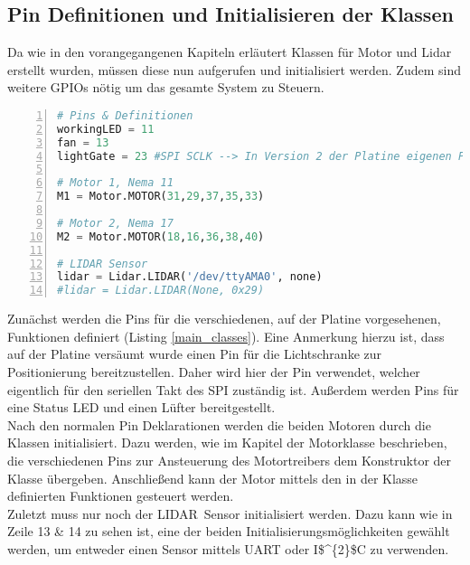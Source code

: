 \subsection{Pin Definitionen und Initialisieren der Klassen}
Da wie in den vorangegangenen Kapiteln erläutert Klassen für Motor und Lidar erstellt wurden, müssen diese nun aufgerufen und initialisiert werden. Zudem sind weitere \acp{GPIO} nötig um das gesamte System zu Steuern.
\begin{lstlisting}[caption={Initialisieren von Variablen und Klassen}, language={Python}, label={main_classes}, numbers=left]
# Pins & Definitionen
workingLED = 11
fan = 13
lightGate = 23 #SPI SCLK --> In Version 2 der Platine eigenen Pin zuweisen

# Motor 1, Nema 11
M1 = Motor.MOTOR(31,29,37,35,33)

# Motor 2, Nema 17
M2 = Motor.MOTOR(18,16,36,38,40)

# LIDAR Sensor
lidar = Lidar.LIDAR('/dev/ttyAMA0', none)
#lidar = Lidar.LIDAR(None, 0x29)
\end{lstlisting}
Zunächst werden die Pins für die verschiedenen, auf der Platine vorgesehenen, Funktionen definiert (Listing \ref{main_classes}). Eine Anmerkung hierzu ist, dass auf der Platine versäumt wurde einen Pin für die Lichtschranke zur Positionierung bereitzustellen. Daher wird hier der Pin verwendet, welcher eigentlich für den seriellen Takt des \ac{SPI} zuständig ist. Außerdem werden Pins für eine Status \ac{LED} und einen Lüfter bereitgestellt. \\
Nach den normalen Pin Deklarationen werden die beiden Motoren durch die Klassen initialisiert. Dazu werden, wie im Kapitel der Motorklasse beschrieben, die verschiedenen Pins zur Ansteuerung des Motortreibers dem Konstruktor der Klasse übergeben. Anschließend kann der Motor mittels den in der Klasse definierten Funktionen gesteuert werden.\\
Zuletzt muss nur noch der \ac{LIDAR} Sensor initialisiert werden. Dazu kann wie in Zeile 13 \& 14 zu sehen ist, eine der beiden Initialisierungsmöglichkeiten gewählt werden, um entweder einen Sensor mittels \ac{UART} oder \ac{I$^{2}$C} zu verwenden.\\
